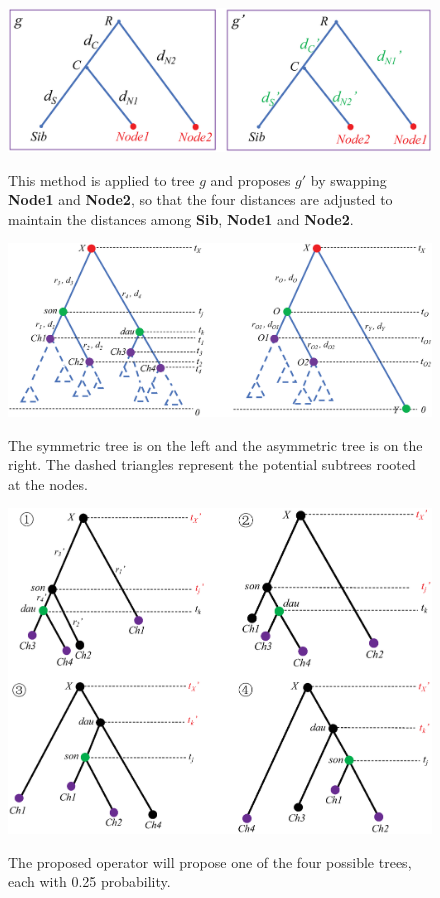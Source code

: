 \documentclass{bmcart}
\begin{document}
\begin{backmatter}
\begin{figure}[h!]
\includegraphics[width=12cm]{exchangemethod.eps}\\
\caption{
             This method is applied to tree $g$ and proposes $g'$ by swapping \textbf{Node1} and \textbf{Node2}, so that the four distances are adjusted to maintain the distances among \textbf{Sib}, \textbf{Node1} and \textbf{Node2}.}
\label{exchangemethod}
\end{figure}

\begin{figure}[h!]
\includegraphics[width=12cm]{treeshape.eps}\\
\caption{
             The symmetric tree is on the left and the asymmetric tree is on the right. The dashed triangles represent the potential subtrees rooted at the nodes.}
\label{treeshape}
\end{figure}

\begin{figure}[h!]
\includegraphics[width=12cm]{symmetric.eps}\\
\caption{
             The proposed operator will propose one of the four possible trees, each with 0.25 probability.}
\label{symmetric}
\end{figure}


\end{backmatter}
\end{document}

